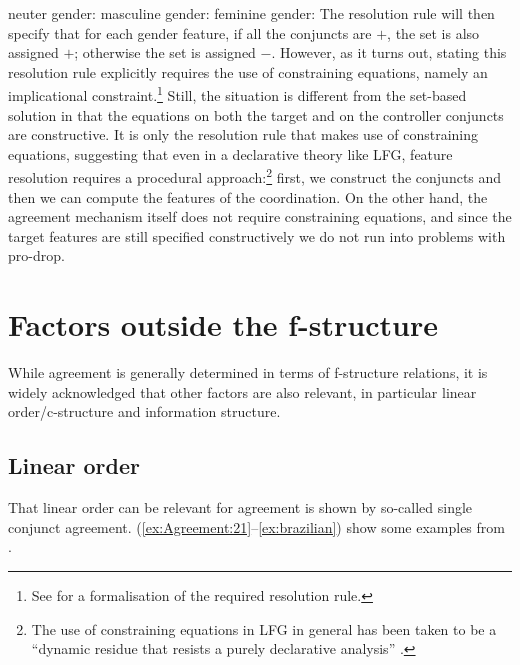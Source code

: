 \documentclass[output=paper,hidelinks]{langscibook}
\begin{document}
\ea
\ea neuter gender: \avm[style=fstr]{[m & $-$\\f & $-$]}
\ex masculine gender: \avm[style=fstr]{[m & $+$\\f & $-$]}
\ex feminine gender: \avm[style=fstr]{[m & $-$\\f & $+$]}
\z \z The resolution rule will then specify that for each gender feature, if all
the conjuncts are $+$, the set is also assigned $+$; otherwise the set
is assigned $-$. However, as it turns out, stating this resolution
rule explicitly requires the use of constraining equations, namely an
implicational constraint.\footnote{See \citet[640]{DLM:LFG} for a
formalisation of the required resolution rule.} Still, the situation
is different from the set-based solution in that the equations on both
the target and on the controller conjuncts are constructive. It is
only the resolution rule that makes use of constraining equations,
suggesting that even in a declarative theory like LFG, feature
resolution requires a procedural approach:\footnote{The use of constraining equations in LFG in general has been taken to be a ``dynamic residue that resists a purely declarative analysis'' \citep[44]{blackburn1995a-specification}.} first, we construct the
conjuncts and then we can compute the features of the coordination.
On the other hand, the agreement mechanism itself does not require
constraining equations, and since the target features are still
specified constructively we do not run into problems with pro-drop.




\section{Factors outside the f-structure}\label{sec:outsidef}
While agreement is generally determined in terms of f-structure
relations, it is widely acknowledged that other factors are also
relevant, in particular linear order/c-structure and information
structure.

\subsection{Linear order}
That linear order can be relevant for agreement is shown by so-called
single conjunct agreement. (\ref{ex:Agreement:21}--\ref{ex:brazilian}) show some examples from \citet{KuhnSadler:LFG07}.
\end{document}
